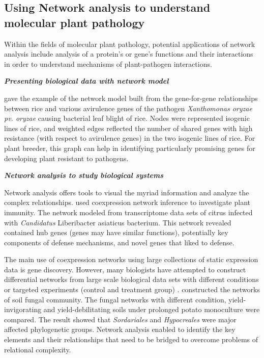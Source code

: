 \subsection*{Using Network analysis to understand molecular plant pathology}
Within the fields of molecular plant pathology, potential applications of network analysis include analysis of a protein’s or gene’s functions and their interactions in order to understand mechanisms of plant-pathogen interactions.

\textit{\textbf{Presenting biological data with network model}}

 gave the example of the network model built from the gene-for-gene relationships between rice and various avirulence genes of the pathogen \textit{Xanthomonas oryzae pv. oryzae} causing bacterial leaf blight of rice. Nodes were represented isogenic lines of rice, and weighted edges reflected the number of shared genes with high resistance (with respect to avirulence genes) in the two isogenic lines of rice. For plant breeder, this graph can help in identifying particularly promising genes for developing plant resistant to pathogens. 

\textit{\textbf{Network analysis to study biological systems}}

Network analysis offers tools to visual the myriad information and analyze the complex relationships.  used coexpression network inference to investigate plant immunity. The network modeled from transcriptome data sets of citrus infected with \textit{Candidatus} Liberibacter asiaticus bacterium. This network revealed contained hub genes (genes may have similar functions), potentially key components of defense mechanisms, and novel genes that liked to defense. 

The main use of coexpression networks using large collections of static expression data is gene discovery. However, many biologists have attempted to construct differential networks from large scale biological data sets with different conditions or targeted experiments (control and treatment group) .  constructed the networks of soil fungal community. The fungal networks with different condition, yield-invigorating and yield-debilitating soils under prolonged potato monoculture were compared. The result showed that \textit{Sordariales} and \textit{Hypocreales} were major affected phylogenetic groups. Network analysis enabled to identify the key elements and their relationships that need to be bridged to overcome problems of relational complexity.

